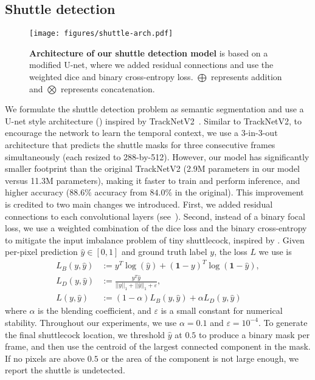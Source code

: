 \subsection{Shuttle detection}
\label{sec:shuttle-tracking}
\begin{figure}[ht]
    \centering
    \texttt{[image: figures/shuttle-arch.pdf]}
    \caption{{\bf Architecture of our shuttle detection model} is based on a modified U-net, where we added residual connections and use the weighted dice and binary cross-entropy loss. $\bigoplus$ represents addition and $\bigotimes$ represents concatenation.}
    \label{fig:our-tracknet}
\end{figure}

We formulate the shuttle detection problem as semantic segmentation and use a U-net style architecture () inspired by TrackNetV2~\cite{sun_tracknetv2_2020}. Similar to TrackNetV2, to encourage the network to learn the temporal context, we use a 3-in-3-out architecture that predicts the shuttle masks for three consecutive frames simultaneously (each resized to 288-by-512). However, our model has significantly smaller footprint than the original TrackNetV2 (2.9M parameters in our model versus 11.3M parameters), making it faster to train and perform inference, and higher accuracy ($88.6\%$ accuracy from $84.0\%$ in the original). This improvement is credited to two main changes we introduced. First, we added residual connections to each convolutional layers (see~). Second, instead of a binary focal loss, we use a weighted combination of the dice loss and the binary cross-entropy to mitigate the input imbalance problem of tiny shuttlecock, inspired by \cite{combo_loss}. Given per-pixel prediction $\hat{y} \in [0,1]$ and ground truth label $y$, the loss $L$ we use is
\begin{align*}
    L_{B}(y, \hat{y}) &:= y^T \log(\hat{y}) + (\mathbf{1}-y)^T \log (\mathbf{1} - \hat{y}), \\
    L_{D}(y, \hat{y}) &:= \frac{y^T \hat{y}}{||y||_1 + ||\hat{y}||_1 + \varepsilon}, \\
    L(y, \hat{y}) &:= (1 - \alpha) L_{B}(y, \hat{y}) + \alpha L_{D}(y, \hat{y})
\end{align*}
where $\alpha$ is the blending coefficient, and $\varepsilon$ is a small constant for numerical stability. Throughout our experiments, we use $\alpha=0.1$ and $\varepsilon=10^{-4}$. To generate the final shuttlecock location, we threshold $\hat{y}$ at $0.5$ to produce a binary mask per frame, and then use the centroid of the largest connected component in the mask. If no pixels are above $0.5$ or the area of the component is not large enough, we report the shuttle is undetected.

